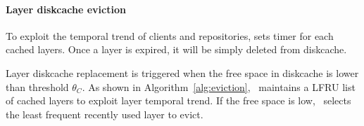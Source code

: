 \paragraph{Layer diskcache eviction}
To exploit the temporal trend of clients and repositories, 
\sysname sets timer for each cached layers.
Once a layer is expired,
it will be simply deleted from diskcache.

Layer diskcache replacement is triggered when the free space in diskcache is
lower than threshold $\theta_{C}$.
As shown in Algorithm~\ref{alg:eviction}, 
\sysname~maintains a LFRU list~\cite{xxx} of cached layers to exploit 
layer temporal trend.
If the free space is low,
\sysname~selects the least frequent recently used layer to evict.




%

